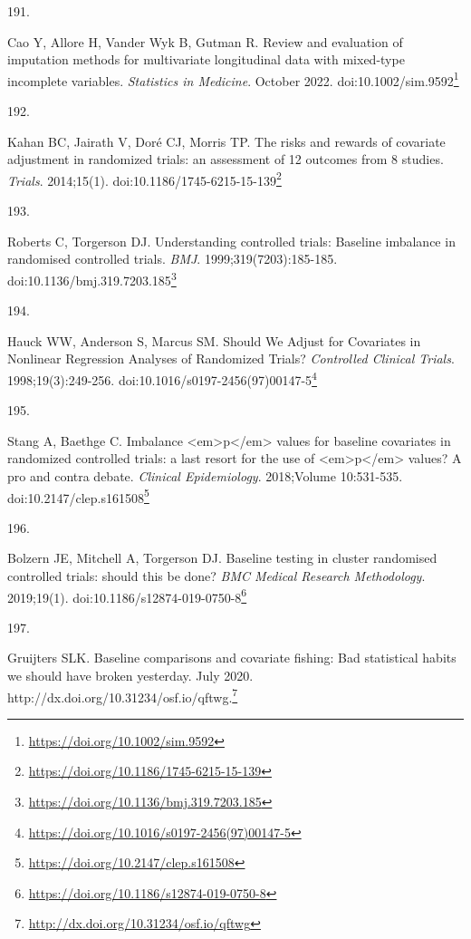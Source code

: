 \documentclass[
  a4paper,
]{book}
\newlength{\cslhangindent}
\newlength{\csllabelwidth}
\newlength{\cslentryspacingunit} %
\newenvironment{CSLReferences}[2] %
 {%
  \setlength{\parindent}{0pt}
  \ifodd #1
  \let\oldpar\par
  \def\par{\hangindent=\cslhangindent\oldpar}
  \fi
  \setlength{\parskip}{#2\cslentryspacingunit}
 }%
 {}
\newcommand{\CSLLeftMargin}[1]{\parbox[t]{\csllabelwidth}{#1}}
\newcommand{\CSLRightInline}[1]{\parbox[t]{\linewidth - \csllabelwidth}{#1}\break}
\renewcommand{\href}[2]{#2\footnote{\url{#1}}}
\begin{document}
\begin{CSLReferences}{0}{0}
\leavevmode{}%
\CSLLeftMargin{191. }%
\CSLRightInline{Cao Y, Allore H, Vander Wyk B, Gutman R. Review and evaluation of imputation methods for multivariate longitudinal data with mixed{-}type incomplete variables. \emph{Statistics in Medicine}. October 2022. doi:\href{https://doi.org/10.1002/sim.9592}{10.1002/sim.9592}}

\leavevmode{}%
\CSLLeftMargin{192. }%
\CSLRightInline{Kahan BC, Jairath V, Doré CJ, Morris TP. The risks and rewards of covariate adjustment in randomized trials: an assessment of 12 outcomes from 8 studies. \emph{Trials}. 2014;15(1). doi:\href{https://doi.org/10.1186/1745-6215-15-139}{10.1186/1745-6215-15-139}}

\leavevmode{}%
\CSLLeftMargin{193. }%
\CSLRightInline{Roberts C, Torgerson DJ. Understanding controlled trials: Baseline imbalance in randomised controlled trials. \emph{BMJ}. 1999;319(7203):185-185. doi:\href{https://doi.org/10.1136/bmj.319.7203.185}{10.1136/bmj.319.7203.185}}

\leavevmode{}%
\CSLLeftMargin{194. }%
\CSLRightInline{Hauck WW, Anderson S, Marcus SM. Should We Adjust for Covariates in Nonlinear Regression Analyses of Randomized Trials? \emph{Controlled Clinical Trials}. 1998;19(3):249-256. doi:\href{https://doi.org/10.1016/s0197-2456(97)00147-5}{10.1016/s0197-2456(97)00147-5}}

\leavevmode{}%
\CSLLeftMargin{195. }%
\CSLRightInline{Stang A, Baethge C. Imbalance \textless em\textgreater p\textless/em\textgreater{} values for baseline covariates in randomized controlled trials: a last resort for the use of \textless em\textgreater p\textless/em\textgreater{} values? A pro and contra debate. \emph{Clinical Epidemiology}. 2018;Volume 10:531-535. doi:\href{https://doi.org/10.2147/clep.s161508}{10.2147/clep.s161508}}

\leavevmode{}%
\CSLLeftMargin{196. }%
\CSLRightInline{Bolzern JE, Mitchell A, Torgerson DJ. Baseline testing in cluster randomised controlled trials: should this be done? \emph{BMC Medical Research Methodology}. 2019;19(1). doi:\href{https://doi.org/10.1186/s12874-019-0750-8}{10.1186/s12874-019-0750-8}}

\leavevmode{}%
\CSLLeftMargin{197. }%
\CSLRightInline{Gruijters SLK. Baseline comparisons and covariate fishing: Bad statistical habits we should have broken yesterday. July 2020. \href{http://dx.doi.org/10.31234/osf.io/qftwg}{http://dx.doi.org/10.31234/osf.io/qftwg.}}


\end{CSLReferences}
\end{document}
